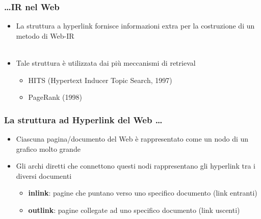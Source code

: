 \documentclass{beamer}
\begin{document}

\begin{frame}
	\frametitle{\dots IR nel Web}
	\begin{itemize}
	\item La struttura a hyperlink fornisce informazioni extra per la costruzione di un metodo di Web-IR \\~\\
	\item Tale struttura è utilizzata dai più meccanismi di retrieval
	\begin{itemize}
		\item HITS (Hypertext Inducer Topic Search, 1997)
		\item PageRank (1998)
	\end{itemize}
\end{itemize}
\end{frame}
\begin{frame}
	\frametitle{La struttura ad Hyperlink del Web \dots}
	\begin{itemize}
		\item Ciascuna pagina/documento del Web è
		rappresentato come un nodo di un grafico
		molto grande
		\item Gli archi diretti che connettono questi nodi rappresentano gli hyperlink tra i diversi documenti
		\begin{itemize}
			\item \textbf{inlink}: pagine che puntano verso uno specifico documento (link entranti)
			\item \textbf{outlink}: pagine collegate ad uno specifico documento (link uscenti)
		\end{itemize}
	\end{itemize}
\end{frame}
\end{document}
